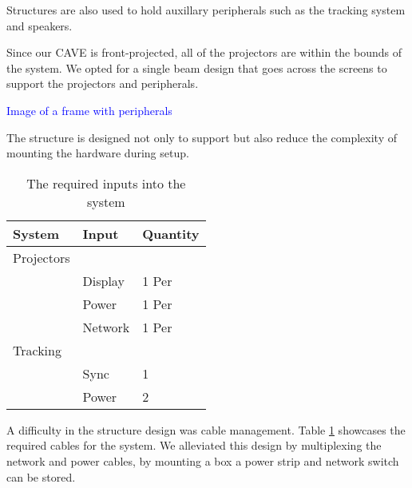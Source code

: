 Structures are also used to hold auxillary peripherals such as the tracking system and speakers.

Since our CAVE is front-projected, all of the projectors are within the bounds of the system. We opted for a single beam design that goes across the screens to support the projectors and peripherals. 


\begin{center}
	\textcolor{blue}{Image of a frame with peripherals}
\end{center}

The structure is designed not only to support but also reduce the complexity of mounting the hardware during setup. 



\filbreak
\begin{table}[H]
	\centering
	\renewcommand\arraystretch{0.5}
	\begin{tabular}{l|l|l}
		\hline 
		System & Input & Quantity \\ 
		\hline 
		Projectors	&  			&  			\\ 
					&  Display 	&  1 Per 	\\ 
					&  Power 	&  1 Per 	\\ 
					&  Network 	&  1 Per 	\\
		Tracking	&  			&  			\\
					&  Sync 	&  1 	 	\\ 	
					&  Power 	&  2 	 	\\	
	\end{tabular} 
		
	\caption{The required inputs into the system} \label{table:requiredInputs}
\end{table}

A difficulty in the structure design was cable management. Table \ref{table:requiredInputs} showcases the required cables for the system. We alleviated this design by multiplexing the network and power cables, by mounting a box a power strip and network switch can be stored.



